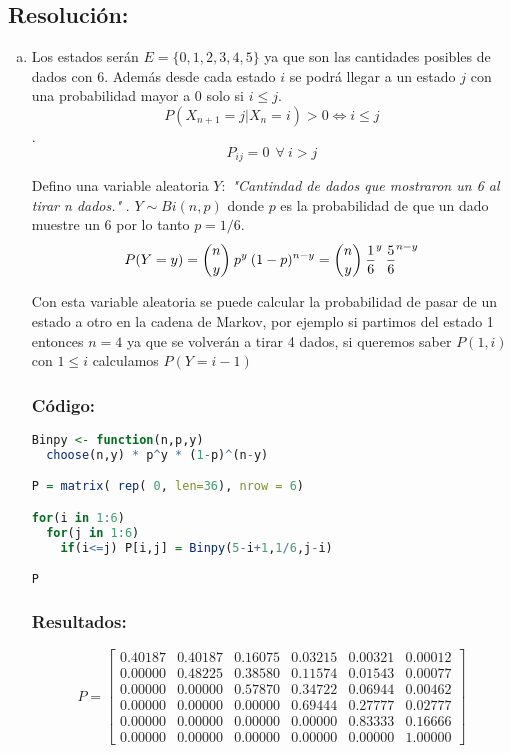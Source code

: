 \documentclass{article}
\begin{document}
\subsection*{Resolución:}


\begin{enumerate}[(a)] 
\item Los estados serán $ E = \{0,1,2,3,4,5\} $ ya que son las cantidades posibles de dados con 6. Además desde cada estado $i$ se podrá llegar a un estado $j$ con una probabilidad mayor a 0 solo si $i \leq j$.  $$P(X_{n+1} = j | X_{n} = i) > 0 \iff i \leq j$$.
$$ P_{ij} = 0 \: \: \forall \: i>j $$

Defino una variable aleatoria $Y:$ \textit{"Cantindad de dados que mostraron un 6 al tirar n dados."} . $Y \sim Bi(n,p)$ donde $p$ es la probabilidad de que un dado muestre un 6 por lo tanto $p = 1/6$.
$$P(Y = y) =  {n \choose y} \: p^{y} \: (1-p)^{n-y} = {n \choose y} \: {1 \over 6}^{y} \: {5 \over 6}^{n-y}$$

Con esta variable aleatoria se puede calcular la probabilidad de pasar de un estado a otro en la cadena de Markov, por ejemplo si partimos del estado 1 entonces $n = 4$ ya que se volverán a tirar 4 dados, si queremos saber $P(1,i)$ con $1 \leq i$ calculamos $P(Y = i-1) $

\subsubsection*{Código:}
\begin{lstlisting}[language=R]
Binpy <- function(n,p,y)
  choose(n,y) * p^y * (1-p)^(n-y)

P = matrix( rep( 0, len=36), nrow = 6)

for(i in 1:6)
  for(j in 1:6)
    if(i<=j) P[i,j] = Binpy(5-i+1,1/6,j-i)

P
\end{lstlisting}

\subsubsection*{Resultados:}

$$
P = 
\begin{bmatrix}
0.40187 & 0.40187 & 0.16075 & 0.03215 & 0.00321 & 0.00012 \\
0.00000 & 0.48225 & 0.38580 & 0.11574 & 0.01543 & 0.00077 \\
0.00000 & 0.00000 & 0.57870 & 0.34722 & 0.06944 & 0.00462 \\
0.00000 & 0.00000 & 0.00000 & 0.69444 & 0.27777 & 0.02777 \\
0.00000 & 0.00000 & 0.00000 & 0.00000 & 0.83333 & 0.16666 \\
0.00000 & 0.00000 & 0.00000 & 0.00000 & 0.00000 & 1.00000
\end{bmatrix}
$$


\end{enumerate}
\end{document}
